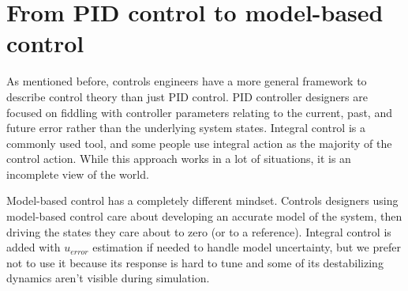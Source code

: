 \section{From PID control to model-based control}

As mentioned before, controls engineers have a more general framework to
describe control theory than just PID control. PID controller designers are
focused on fiddling with controller parameters relating to the current, past,
and future \gls{error} rather than the underlying system \glspl{state}. Integral
control is a commonly used tool, and some people use integral action as the
majority of the control action. While this approach works in a lot of
situations, it is an incomplete view of the world.

Model-based control has a completely different mindset. Controls designers using
model-based control care about developing an accurate \gls{model} of the
\gls{system}, then driving the \glspl{state} they care about to zero (or to a
\gls{reference}). Integral control is added with $u_{error}$ estimation if
needed to handle \gls{model} uncertainty, but we prefer not to use it because
its response is hard to tune and some of its destabilizing dynamics aren't
visible during simulation.
